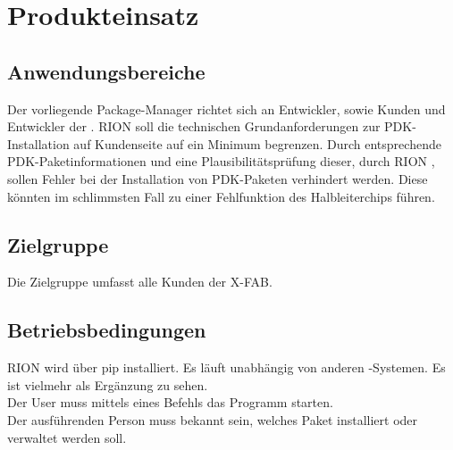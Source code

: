 \chapter{Produkteinsatz}

\section{Anwendungsbereiche}
Der vorliegende Package-Manager richtet sich an Entwickler, sowie Kunden und Entwickler der \x.
RION soll die technischen Grundanforderungen zur PDK-Installation auf Kundenseite auf ein Minimum begrenzen. Durch entsprechende PDK-Paketinformationen und eine Plausibilitätsprüfung dieser, durch RION , sollen Fehler bei der Installation von PDK-Paketen verhindert werden. Diese könnten im schlimmsten Fall zu einer Fehlfunktion des Halbleiterchips führen.
\section{Zielgruppe}
Die Zielgruppe umfasst alle Kunden der X-FAB.


\section{Betriebsbedingungen}
RION wird über pip installiert. Es läuft unabhängig von anderen \x-Systemen. Es ist vielmehr als Ergänzung zu sehen.\\
Der User muss mittels eines Befehls das Programm starten.\\
Der ausführenden Person muss bekannt sein, welches Paket installiert oder verwaltet werden soll.
